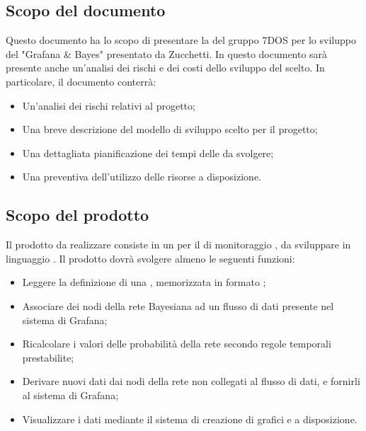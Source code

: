 \subsection{Scopo del documento}
Questo documento ha lo scopo di presentare la  del gruppo 7DOS per lo sviluppo del  "Grafana \& Bayes" presentato da Zucchetti. In questo documento sarà presente anche un'analisi dei rischi e dei costi dello sviluppo del  scelto.
In particolare, il documento conterrà:
\begin{itemize}
	\item Un'analisi dei rischi relativi al progetto;
	\item Una breve descrizione del modello di sviluppo scelto per il progetto;
	\item Una dettagliata pianificazione dei tempi delle  da svolgere;
	\item Una  preventiva dell'utilizzo delle risorse a disposizione.
\end{itemize}


\subsection{Scopo del prodotto}
Il prodotto da realizzare consiste in un  per il  di monitoraggio , da sviluppare in linguaggio . Il prodotto dovrà svolgere almeno le seguenti funzioni:
\begin{itemize}
	\item{Leggere la definizione di una , memorizzata in formato ;}
	\item{Associare dei nodi della rete Bayesiana ad un flusso di dati presente nel sistema di Grafana;}
	\item{Ricalcolare i valori delle probabilità della rete secondo regole temporali prestabilite;}
	\item{Derivare nuovi dati dai nodi della rete non collegati al flusso di dati, e fornirli al sistema di Grafana;}
	\item{Visualizzare i dati mediante il sistema di creazione di grafici e  a disposizione.}
\end{itemize}

